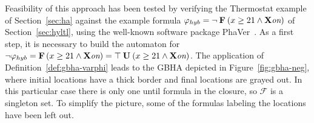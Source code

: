 \documentclass[submission,copyright,creativecommons]{eptcs}
\newcommand{\X}{\ensuremath{\mathbin{\mathbf{X}}}\xspace}
\newcommand{\U}{\ensuremath{\mathbin{\mathbf{U}}}\xspace}
\newcommand{\F}{\ensuremath{\mathbin{\mathbf{F}}}\xspace}
\newcommand{\on}{\text{\it on}}
\newcommand{\cvF}{\mathcal{F}}
\begin{document}
Feasibility of this approach has been tested by verifying the Thermostat example of Section~\ref{sec:ha} against the example formula $\varphi_{hyb} = \neg \F \left( x \geq 21 \land \X \on\right)$ of Section~\ref{sec:hyltl}, using the well-known software package PhaVer~\cite{Frehse2008}. 
As a first step, it is necessary to build the automaton for $\neg\varphi_{hyb} = \F \left( x \geq 21\land \X\on \right) = \top \U \left( x \geq 21 \land \X \on \right)$. The application of Definition~\ref{def:gbha-varphi} leads to the GBHA depicted in Figure~\ref{fig:gbha-neg}, where initial locations have a thick border and final locations are grayed out. In this particular case there is only one until formula in the closure, so $\cvF$ is a singleton set.
To simplify the picture, some of the formulas labeling the locations have been left out.
\end{document}
